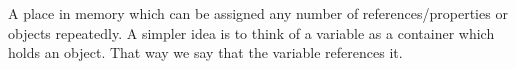 \documentclass[../../../book.tex]{subfiles}
\begin{document}
A place in memory which can be assigned any number of references/properties or objects repeatedly. A simpler idea is to think of a variable as a container which holds an object. That way we say that the variable references it. 
\end{document}
